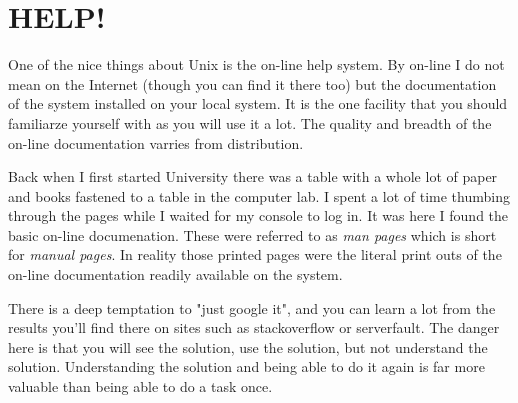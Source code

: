\chapter{HELP!}

One of the nice things about Unix is the on-line help system. By on-line I do
not mean on the Internet (though you can find it there too)
but the documentation of the system installed on your local system. 
It is the one facility that you should familiarze yourself with as you will use it a lot.
The quality and breadth of the on-line documentation varries from distribution. 
 
Back when I first started University there was a table with a whole lot of paper
and books fastened to a table in the computer lab.  I spent a lot of time
thumbing through the pages while I waited for my console to log in.  It was
here I found the basic on-line documenation.   These were referred to as 
{\em man pages} which is short for {\em manual pages}.  In reality those
printed pages were the literal print outs of the on-line documentation readily
available on the system.

There is a deep temptation to "just google it", and you can learn a lot
from the results you'll find there on sites such as stackoverflow or
serverfault. The danger here is that you will see the solution, use the
solution, but not understand the solution. Understanding the solution and
being able to do it again is far more valuable than being able to do a task
once.
